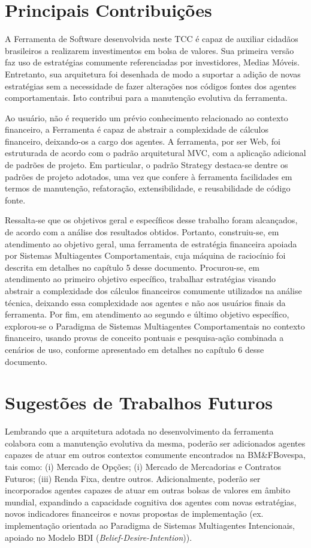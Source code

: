 \section{Principais Contribuições}

A Ferramenta de Software desenvolvida neste TCC é capaz de auxiliar cidadãos brasileiros a realizarem investimentos em bolsa de valores. Sua primeira versão faz uso de estratégias comumente referenciadas por investidores, Medias Móveis.  Entretanto, sua arquitetura foi desenhada de modo a suportar a adição de novas estratégias sem a necessidade de fazer alterações nos códigos fontes dos agentes comportamentais. Isto contribui para a manutenção evolutiva da ferramenta.

Ao usuário, não é requerido um prévio conhecimento relacionado ao contexto financeiro, a Ferramenta é capaz de abstrair a complexidade de cálculos financeiro, deixando-os a cargo dos agentes. A ferramenta, por ser Web, foi estruturada de acordo com o padrão arquitetural MVC, com a aplicação adicional de padrões de projeto. Em particular, o padrão Strategy destaca-se dentre os padrões de projeto adotados, uma vez que confere à ferramenta facilidades em termos de manutenção, refatoração, extensibilidade, e reusabilidade de código fonte.

Ressalta-se que os objetivos geral e específicos desse trabalho foram alcançados, de acordo com a análise dos resultados obtidos. Portanto, construiu-se, em atendimento ao objetivo geral, uma ferramenta de estratégia financeira apoiada por Sistemas Multiagentes Comportamentais, cuja máquina de raciocínio foi descrita em detalhes no capítulo 5 desse documento. Procurou-se, em atendimento ao primeiro objetivo específico, trabalhar estratégias visando abstrair a complexidade dos cálculos financeiros comumente utilizados na análise técnica, deixando essa complexidade aos agentes e não aos usuários finais da ferramenta. Por fim, em atendimento ao segundo e último objetivo específico, explorou-se o Paradigma de Sistemas Multiagentes Comportamentais no contexto financeiro, usando provas de conceito pontuais e pesquisa-ação combinada a cenários de uso, conforme apresentado em detalhes no capítulo 6 desse documento.


\section{Sugestões de Trabalhos Futuros}

Lembrando que a arquitetura adotada no desenvolvimento da ferramenta colabora com a manutenção evolutiva da mesma, poderão ser adicionados agentes capazes de atuar em outros contextos comumente encontrados na BM\&FBovespa, tais como: (i) Mercado de Opções; (i) Mercado de Mercadorias e Contratos Futuros; (iii) Renda Fixa, dentre outros. Adicionalmente, poderão ser incorporados agentes capazes de atuar em outras bolsas de valores em âmbito mundial, expandindo a capacidade cognitiva dos agentes com novas estratégias, novos indicadores financeiros e novas propostas de implementação (ex. implementação orientada ao Paradigma de Sistemas Multiagentes Intencionais, apoiado no Modelo BDI (\textit{Belief-Desire-Intention})).

